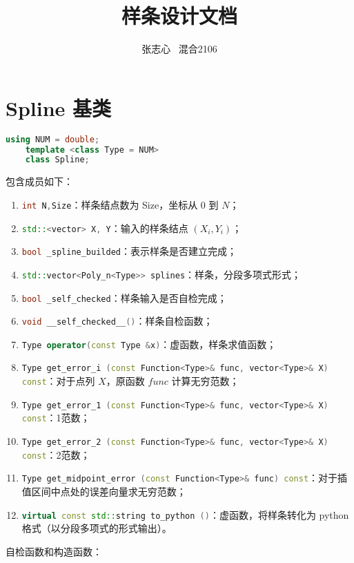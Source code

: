 \documentclass[lang=cn,a4paper,newtx,bibend=bibtex]{elegantpaper}
\title{样条设计文档}
\author{张志心 \ 混合2106}
\date{\zhdate{2024/01/04}}
\begin{document}
\maketitle

\section{Spline 基类}

\begin{lstlisting}[language = C++]
    using NUM = double;
    template <class Type = NUM>
    class Spline;
\end{lstlisting}

包含成员如下：

\begin{enumerate}
\item \lstinline[language=C++]{int N,Size}：样条结点数为 Size，坐标从 0 到 $N$；
\item \lstinline[language=C++]{std::<vector> X, Y}：输入的样条结点 $(X_i, Y_i)$；
\item \lstinline[language=C++]{bool _spline_builded}：表示样条是否建立完成；
\item \lstinline[language=C++]{std::vector<Poly_n<Type>> splines}：样条，分段多项式形式；
\item \lstinline[language=C++]{bool _self_checked}：样条输入是否自检完成；
\item \lstinline[language=C++]{void __self_checked__()}：样条自检函数；
\item \lstinline[language=C++]{Type operator(const Type &x)}：虚函数，样条求值函数；
\item \lstinline[language=C++]{Type get_error_i (const Function<Type>& func, vector<Type>& X) const}：对于点列 $X$，原函数 $func$ 计算无穷范数；
\item \lstinline[language=C++]{Type get_error_1 (const Function<Type>& func, vector<Type>& X) const}：1范数；
\item \lstinline[language=C++]{Type get_error_2 (const Function<Type>& func, vector<Type>& X) const}：2范数；
\item \lstinline[language=C++]{Type get_midpoint_error (const Function<Type>& func) const}：对于插值区间中点处的误差向量求无穷范数；
\item \lstinline[language=C++]{virtual const std::string to_python ()}：虚函数，将样条转化为 python 格式（以分段多项式的形式输出）。
\end{enumerate}

自检函数和构造函数：
\end{document}
